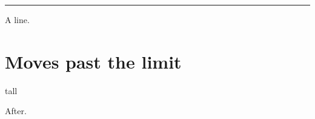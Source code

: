 \noindent\rule{1pt}{\dimexpr\textheight-\baselineskip\relax}\par
A line.

\section*{Moves past the limit}
\noindent\parbox{\linewidth}{\rule{0pt}{12\baselineskip}tall}

After.
